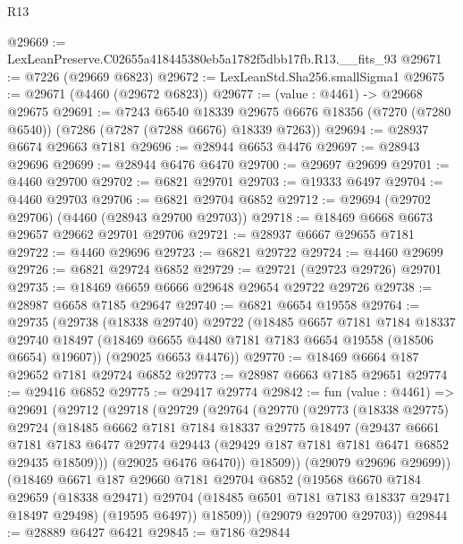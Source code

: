 \begin{lexlean}{R13}
\begin{coremodule}
@29669 := LexLeanPreserve.C02655a418445380eb5a1782f5dbb17fb.R13.__fits_93
@29671 := @7226 (@29669 @6823)
@29672 := LexLeanStd.Sha256.smallSigma1
@29675 := @29671 (@4460 (@29672 @6823))
@29677 := (value : @4461) -> @29668 @29675
@29691 := @7243
    @6540
    @18339
    @29675
    @6676
    @18356
    (@7270 (@7280 @6540))
    (@7286 (@7287 (@7288 @6676) @18339 @7263))
@29694 := @28937 @6674 @29663 @7181
@29696 := @28944 @6653 @4476
@29697 := @28943 @29696
@29699 := @28944 @6476 @6470
@29700 := @29697 @29699
@29701 := @4460 @29700
@29702 := @6821 @29701
@29703 := @19333 @6497
@29704 := @4460 @29703
@29706 := @6821 @29704 @6852
@29712 := @29694 (@29702 @29706) (@4460 (@28943 @29700 @29703))
@29718 := @18469 @6668 @6673 @29657 @29662 @29701 @29706
@29721 := @28937 @6667 @29655 @7181
@29722 := @4460 @29696
@29723 := @6821 @29722
@29724 := @4460 @29699
@29726 := @6821 @29724 @6852
@29729 := @29721 (@29723 @29726) @29701
@29735 := @18469 @6659 @6666 @29648 @29654 @29722 @29726
@29738 := @28987 @6658 @7185 @29647
@29740 := @6821 @6654 @19558
@29764 := @29735
    (@29738
      (@18338 @29740)
      @29722
      (@18485
        @6657
        @7181
        @7184
        @18337
        @29740
        @18497
        (@18469 @6655 @4480 @7181 @7183 @6654 @19558 (@18506 @6654) @19607))
      (@29025 @6653 @4476))
@29770 := @18469 @6664 @187 @29652 @7181 @29724 @6852
@29773 := @28987 @6663 @7185 @29651
@29774 := @29416 @6852
@29775 := @29417 @29774
@29842 := fun (value : @4461) =>
  @29691
    (@29712
      (@29718
        (@29729
          (@29764
            (@29770
              (@29773
                (@18338 @29775)
                @29724
                (@18485
                  @6662
                  @7181
                  @7184
                  @18337
                  @29775
                  @18497
                  (@29437
                    @6661
                    @7181
                    @7183
                    @6477
                    @29774
                    @29443
                    (@29429 @187 @7181 @7181 @6471 @6852 @29435 @18509)))
                (@29025 @6476 @6470))
              @18509))
          (@29079 @29696 @29699))
        (@18469
          @6671
          @187
          @29660
          @7181
          @29704
          @6852
          (@19568
            @6670
            @7184
            @29659
            (@18338 @29471)
            @29704
            (@18485 @6501 @7181 @7183 @18337 @29471 @18497 @29498)
            (@19595 @6497))
          @18509))
      (@29079 @29700 @29703))
@29844 := @28889 @6427 @6421
@29845 := @7186 @29844

\end{coremodule}
\end{lexlean}
